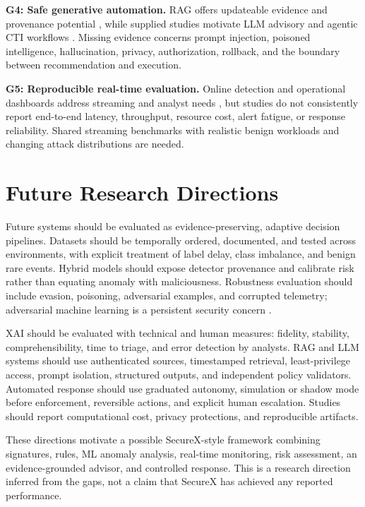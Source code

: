 \documentclass[conference]{IEEEtran}
\begin{document}
\textbf{G4: Safe generative automation.} RAG offers updateable evidence and provenance potential \cite{Lewis2020}, while supplied studies motivate LLM advisory and agentic CTI workflows \cite{Abeywardena2023,Liu2025,Zhivonitko2026}. Missing evidence concerns prompt injection, poisoned intelligence, hallucination, privacy, authorization, rollback, and the boundary between recommendation and execution.

\textbf{G5: Reproducible real-time evaluation.} Online detection and operational dashboards address streaming and analyst needs \cite{Mirsky2018,Kaufhold2022}, but studies do not consistently report end-to-end latency, throughput, resource cost, alert fatigue, or response reliability. Shared streaming benchmarks with realistic benign workloads and changing attack distributions are needed.

\section{Future Research Directions}
Future systems should be evaluated as evidence-preserving, adaptive decision pipelines. Datasets should be temporally ordered, documented, and tested across environments, with explicit treatment of label delay, class imbalance, and benign rare events. Hybrid models should expose detector provenance and calibrate risk rather than equating anomaly with maliciousness. Robustness evaluation should include evasion, poisoning, adversarial examples, and corrupted telemetry; adversarial machine learning is a persistent security concern \cite{BiggioRoli}.

XAI should be evaluated with technical and human measures: fidelity, stability, comprehensibility, time to triage, and error detection by analysts. RAG and LLM systems should use authenticated sources, timestamped retrieval, least-privilege access, prompt isolation, structured outputs, and independent policy validators. Automated response should use graduated autonomy, simulation or shadow mode before enforcement, reversible actions, and explicit human escalation. Studies should report computational cost, privacy protections, and reproducible artifacts.

These directions motivate a possible SecureX-style framework combining signatures, rules, ML anomaly analysis, real-time monitoring, risk assessment, an evidence-grounded advisor, and controlled response. This is a research direction inferred from the gaps, not a claim that SecureX has achieved any reported performance.
\end{document}
